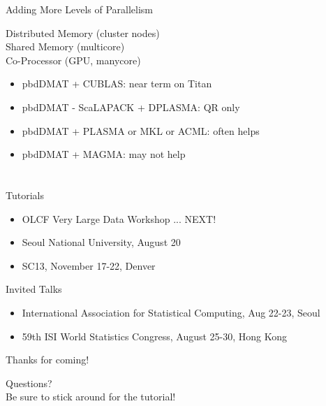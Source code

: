 \begin{frame}
  \begin{block}{Adding More Levels of Parallelism}
    \begin{center}
      {\color{dkblue}Distributed Memory (cluster nodes)} \\
      {\color{dkgreen}Shared Memory (multicore)} \\
      {\color{purple}Co-Processor (GPU, manycore)}
    \end{center}
    \begin{itemize}
      \item {\color{dkblue}pbdDMAT} + {\color{purple}CUBLAS}: near term on Titan 
      \item {\color{dkblue}pbdDMAT} - {\color{dkblue}ScaLAPACK} +
        {\color{dkblue}D}{\color{dkgreen}PLASMA}: QR only 
      \item {\color{dkblue}pbdDMAT} + {\color{dkgreen}PLASMA} or
        {\color{dkgreen}MKL} or {\color{dkgreen}ACML}: often helps 
      \item {\color{dkblue}pbdDMAT} + {\color{purple}MAGMA}: may not help 
    \end{itemize}
  \end{block}
\end{frame}

\hidenum
\section*{}
\begin{frame}[noframenumbering]
  \begin{block}{Tutorials}
  \begin{itemize}
    \item {\small OLCF Very Large Data Workshop
         ... {\color{red} NEXT!}}
    \item {\small Seoul National University, August 20}
    \item {\small SC13, November 17-22, Denver}
  \end{itemize}
  \end{block}
  \begin{block}{Invited Talks}
  \begin{itemize}
    \item {\small International Association for Statistical Computing, Aug 22-23, Seoul}
    \item {\small 59th ISI World Statistics Congress, August 25-30, Hong Kong }
  \end{itemize}
  \end{block}
\end{frame}
  
\begin{frame}[noframenumbering]
 \begin{block}{Thanks for coming!}
 \begin{center}
     {\Large Questions?}\\[1cm]
     {\Large Be sure to stick around for the tutorial!}
  \end{center}
 \end{block}
\end{frame}
